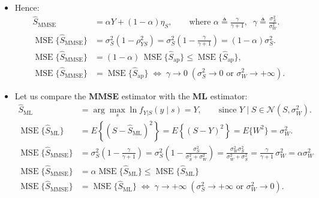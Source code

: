 \begin{itemize}
\item Hence:
\begin{align*}
\hat{S}_{\text{MMSE}}
&= \alpha Y + (1-\alpha)\eta_S,
\qquad
\text{where } \alpha \triangleq \frac{\gamma}{\gamma+1},
\;\; \gamma \triangleq \frac{\sigma_S^{2}}{\sigma_W^{2}}. \\[8pt]
\operatorname{MSE}\{\hat{S}_{\text{MMSE}}\}
&= \sigma_S^{2}(1-\rho_{YS}^{2})
 = \sigma_S^{2}\!\left(1-\frac{\gamma}{\gamma+1}\right)
 = (1-\alpha)\sigma_S^{2}. \\[8pt]
\operatorname{MSE}\{\hat{S}_{\text{MMSE}}\}
&= (1-\alpha)\,\operatorname{MSE}\{\hat{S}_{\text{ap}}\}
 \le \operatorname{MSE}\{\hat{S}_{\text{ap}}\}, \\[4pt]
\operatorname{MSE}\{\hat{S}_{\text{MMSE}}\}
&= \operatorname{MSE}\{\hat{S}_{\text{ap}}\}
 \;\Longleftrightarrow\;
\gamma \to 0
\;(\sigma_S^{2}\to 0 \text{ or } \sigma_W^{2}\to +\infty).
\end{align*}
\item Let us compare the \textbf{MMSE} estimator with the \textbf{ML} estimator:
\begin{align*}
\hat{S}_{\text{ML}}
&= \arg\max_{s} \ln f_{Y|S}(y \mid s)
 = Y,
\qquad \text{since } Y \mid S \in \mathcal{N}(S,\sigma_W^{2}). \\[8pt]
\operatorname{MSE}\{\hat{S}_{\text{ML}}\}
&= E\!\left\{(S-\hat{S}_{\text{ML}})^{2}\right\}
 = E\!\left\{(S-Y)^{2}\right\}
 = E\{W^{2}\}
 = \sigma_W^{2}. \\[8pt]
\operatorname{MSE}\{\hat{S}_{\text{MMSE}}\}
&= \sigma_S^{2}\!\left(1-\frac{\gamma}{\gamma+1}\right)
 = \sigma_S^{2}\!\left(1-\frac{\sigma_S^{2}}{\sigma_S^{2}+\sigma_W^{2}}\right)= \frac{\sigma_W^{2}\sigma_S^{2}}{\sigma_W^{2}+\sigma_S^{2}}
 = \frac{\gamma}{\gamma+1}\,\sigma_W^{2}
 = \alpha \sigma_W^{2}\\[4pt]
\operatorname{MSE}\{\hat{S}_{\text{MMSE}}\}&= \alpha\operatorname{MSE}\{\hat{S}_{\text{ML}}\}
 \le \operatorname{MSE}\{\hat{S}_{\text{ML}}\}\\[8pt]
\operatorname{MSE}\{\hat{S}_{\text{MMSE}}\}
 &= \operatorname{MSE}\{\hat{S}_{\text{ML}}\}
 \;\Longleftrightarrow\;
\gamma \to +\infty
\;(\sigma_S^{2}\to +\infty \text{ or } \sigma_W^{2}\to 0).
\end{align*}


\end{itemize}
